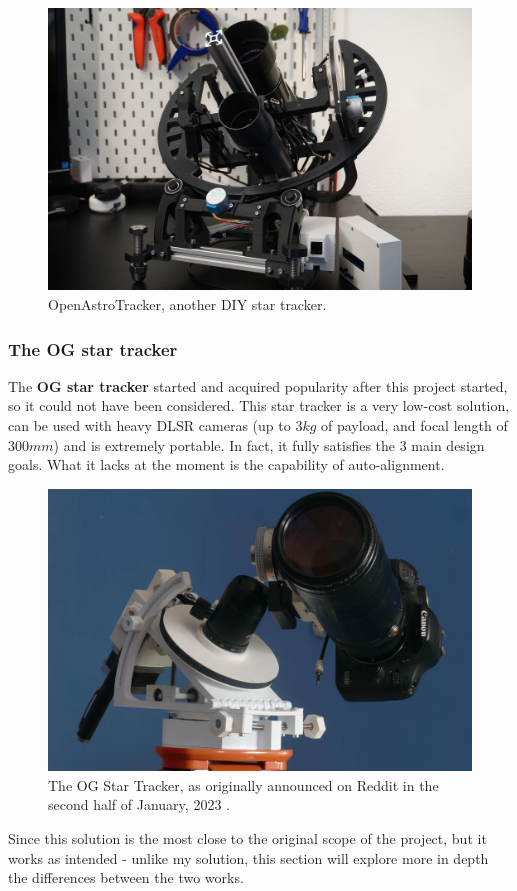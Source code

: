 \documentclass[]{article}
\begin{document}
\begin{figure}[H]
	\centering
	\includegraphics[width=0.7\linewidth]{images/background/openastrotracker.jpeg}
	\caption{OpenAstroTracker, another DIY star tracker.}
\end{figure}

\subsubsection{The OG star tracker}
The \textbf{OG star tracker} \cite{ogstartracker} started and acquired popularity after this project started, so it could not have been considered. This star tracker is a very low-cost solution, can be used with heavy DLSR cameras (up to $3kg$ of payload, and focal length of $300mm$) and is extremely portable. In fact, it fully satisfies the 3 main design goals. What it lacks at the moment is the capability of auto-alignment. 

\begin{figure}[H]
	\centering
	\includegraphics[width=0.7\linewidth]{images/background/ogstartracker.png}
	\caption{The OG Star Tracker, as originally announced on Reddit in the second half of January, 2023 \cite{ogstartrackerreddit}.}
\end{figure}

Since this solution is the most close to the original scope of the project, but it works as intended - unlike my solution, this section will explore more in depth the differences between the two works. 
\end{document}
